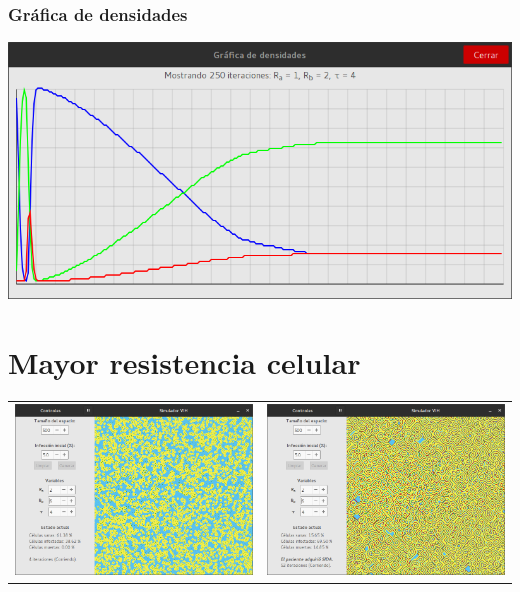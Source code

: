 \documentclass[12pt,letterpaper,oneside]{report}
\begin{document}
	\subsubsection{Gráfica de densidades}
	\begin{center}
		\includegraphics[width=14cm]{img/resistencia/prueba/baja/g.png}\\[3cm]
	\end{center}

	\section{Mayor resistencia celular} %
	\label{sec:mayor_resistencia_celular}
	\begin{center}
		\begin{tabular}{c c}
		\includegraphics[width=8cm]{img/resistencia/prueba/alta/1.png} & \includegraphics[width=8cm]{img/resistencia/prueba/alta/2.png} \\
		\end{tabular}
	\end{center}
	
\end{document}
